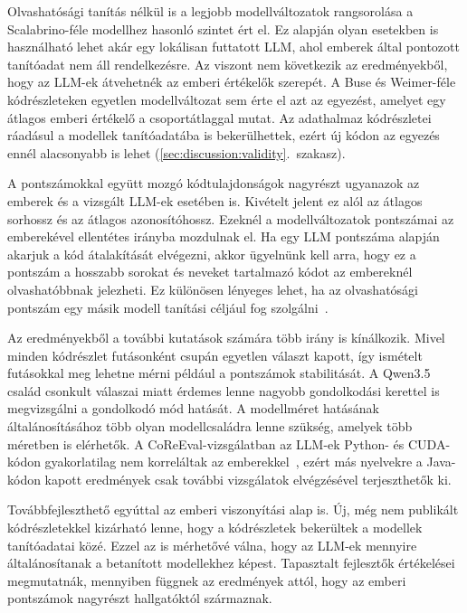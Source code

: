 \documentclass[
]{elteikthesis}[2024/04/26]
\begin{document}
Olvashatósági tanítás nélkül is a legjobb modellváltozatok rangsorolása
a Scalabrino-féle modellhez hasonló szintet ért el.
Ez alapján olyan esetekben is használható lehet akár egy lokálisan futtatott LLM,
ahol emberek által pontozott tanítóadat nem áll rendelkezésre.
Az viszont nem következik az eredményekből, hogy az LLM-ek átvehetnék az emberi értékelők szerepét.
A Buse és Weimer-féle kódrészleteken egyetlen modellváltozat sem érte el azt az egyezést,
amelyet egy átlagos emberi értékelő a csoportátlaggal mutat.
Az adathalmaz kódrészletei ráadásul a modellek tanítóadatába is bekerülhettek,
ezért új kódon az egyezés ennél alacsonyabb is lehet (\ref{sec:discussion:validity}.~szakasz).

A pontszámokkal együtt mozgó kódtulajdonságok nagyrészt ugyanazok az
emberek és a vizsgált LLM-ek esetében is.
Kivételt jelent ez alól az átlagos sorhossz és az átlagos azonosítóhossz.
Ezeknél a modellváltozatok pontszámai az emberekével ellentétes irányba mozdulnak el.
Ha egy LLM pontszáma alapján akarjuk a kód átalakítását elvégezni, akkor ügyelnünk kell arra,
hogy ez a pontszám a hosszabb sorokat és neveket tartalmazó kódot az embereknél olvashatóbbnak jelezheti.
Ez különösen lényeges lehet, ha az olvashatósági pontszám egy másik modell tanítási céljául fog szolgálni~\cite{sergeyuk2024reassessing}.

Az eredményekből a további kutatások számára több irány is kínálkozik.
Mivel minden kódrészlet futásonként csupán egyetlen választ kapott,
így ismételt futásokkal meg lehetne mérni például a pontszámok stabilitását.
A Qwen3.5 család csonkult válaszai miatt érdemes lenne nagyobb gondolkodási kerettel is megvizsgálni a gondolkodó mód hatását.
A modellméret hatásának általánosításához több olyan modellcsaládra lenne szükség, amelyek több méretben is elérhetők.
A CoReEval-vizsgálatban az LLM-ek Python- és CUDA-kódon gyakorlatilag nem korreláltak az emberekkel~\cite{ouedraogo2025coreeval},
ezért más nyelvekre a Java-kódon kapott eredmények csak további vizsgálatok elvégzésével terjeszthetők ki.

Továbbfejleszthető egyúttal az emberi viszonyítási alap is.
Új, még nem publikált kódrészletekkel kizárható lenne, hogy a kódrészletek bekerültek a modellek tanítóadatai közé.
Ezzel az is mérhetővé válna, hogy az LLM-ek mennyire általánosítanak a betanított modellekhez képest.
Tapasztalt fejlesztők értékelései megmutatnák, mennyiben függnek az eredmények attól,
hogy az emberi pontszámok nagyrészt hallgatóktól származnak.

\cleardoublepage
\end{document}
